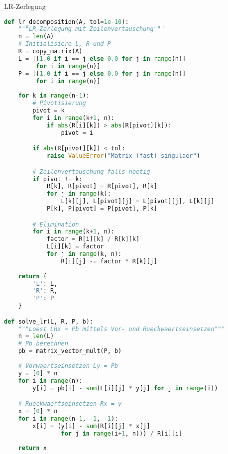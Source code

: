 \begin{examplecode}{LR-Zerlegung}
\begin{lstlisting}[language=Python, style=basesmol]
def lr_decomposition(A, tol=1e-10):
    """LR-Zerlegung mit Zeilenvertauschung"""
    n = len(A)
    # Initialisiere L, R und P
    R = copy_matrix(A)
    L = [[1.0 if i == j else 0.0 for j in range(n)] 
         for i in range(n)]
    P = [[1.0 if i == j else 0.0 for j in range(n)] 
         for i in range(n)]
    
    for k in range(n-1):
        # Pivotisierung
        pivot = k
        for i in range(k+1, n):
            if abs(R[i][k]) > abs(R[pivot][k]):
                pivot = i

        if abs(R[pivot][k]) < tol:
            raise ValueError("Matrix (fast) singulaer")

        # Zeilenvertauschung falls noetig
        if pivot != k:
            R[k], R[pivot] = R[pivot], R[k]
            for j in range(k):
                L[k][j], L[pivot][j] = L[pivot][j], L[k][j]
            P[k], P[pivot] = P[pivot], P[k]

        # Elimination
        for i in range(k+1, n):
            factor = R[i][k] / R[k][k]
            L[i][k] = factor
            for j in range(k, n):
                R[i][j] -= factor * R[k][j]
    
    return {
        'L': L,
        'R': R,
        'P': P
    }

def solve_lr(L, R, P, b):
    """Loest LRx = Pb mittels Vor- und Rueckwaertseinsetzen"""
    n = len(L)
    # Pb berechnen
    pb = matrix_vector_mult(P, b)
    
    # Vorwaertseinsetzen Ly = Pb
    y = [0] * n
    for i in range(n):
        y[i] = pb[i] - sum(L[i][j] * y[j] for j in range(i))

    # Rueckwaertseinsetzen Rx = y
    x = [0] * n
    for i in range(n-1, -1, -1):
        x[i] = (y[i] - sum(R[i][j] * x[j] 
                for j in range(i+1, n))) / R[i][i]
                
    return x
\end{lstlisting}
\end{examplecode}

